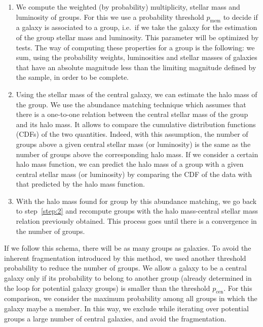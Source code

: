 \begin{enumerate}
    \item We compute the weighted (by probability) multiplicity, stellar mass
        and luminosity of groups. For this we use a probability threshold
        $p_\mathrm{mem}$ to decide if a galaxy is associated to a group, i.e.\
        if we take the galaxy for the estimation of the group stellar mass and
        luminosity. This parameter will be optimized by tests. The way of
        computing these properties for a group is the following: we sum, using
        the probability weights, luminosities and stellar masses of galaxies
        that have an absolute magnitude less than the limiting magnitude
        defined by the sample, in order to be complete.

    \item Using the stellar mass of the central galaxy, we can estimate the
        halo mass of the group. We use the abundance matching technique which
        assumes that there is a one-to-one relation between the central stellar
        mass of the group and its halo mass. It allows to compare the
        cumulative distribution functions (CDFs) of the two quantities. Indeed,
        with this assumption, the number of groups above a given central
        stellar mass (or luminosity) is the same as the number of groups
        above the corresponding halo mass. If we consider a certain halo mass
        function, we can predict the halo mass of a group with a given central
        stellar mass (or luminosity) by comparing the CDF of the data with that
        predicted by the halo mass function.

    \item With the halo mass found for group by this abundance matching, we
        go back to step~\ref{step:2} and recompute groups with the halo
        mass-central stellar mass relation previously obtained. This process
        goes until there is a convergence in the number of groups.
\end{enumerate}

If we follow this schema, there will be as many groups as galaxies. To avoid
the inherent fragmentation introduced by this method, we used another threshold
probability to reduce the number of groups. We allow a galaxy to be a central
galaxy only if its probability to belong to another group (already determined
in the loop for potential galaxy groups) is smaller than the threshold
$p_\mathrm{cen}$. For this comparison, we consider the maximum probability
among all groups in which the galaxy maybe a member. In this way, we exclude
while iterating over potential groups a large number of central galaxies, and
avoid the fragmentation.

